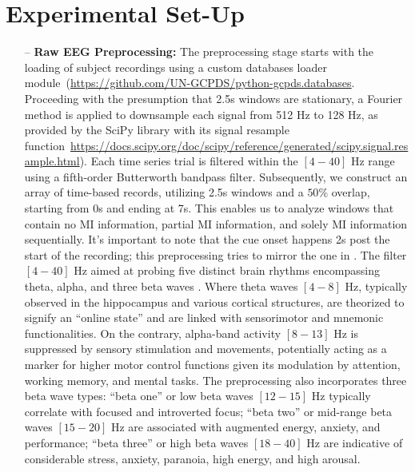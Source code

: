 \section{Experimental Set-Up}


\begin{itemize}

    \item[--] \textbf{Raw EEG Preprocessing:} The preprocessing stage starts with the loading of subject recordings using a custom databases loader module~(\url{https://github.com/UN-GCPDS/python-gcpds.databases}. Proceeding with the presumption that 2.5s windows are stationary, a Fourier method is applied to downsample each signal from 512 Hz to 128 Hz, as provided by the SciPy library with its signal resample function~\url{https://docs.scipy.org/doc/scipy/reference/generated/scipy.signal.resample.html}). Each time series trial is filtered within the $[4-40]$ Hz range using a fifth-order Butterworth bandpass filter. Subsequently, we construct an array of time-based records, utilizing 2.5s windows and a $50\%$ overlap, starting from 0s and ending at 7s. This enables us to analyze windows that contain no MI information, partial MI information, and solely MI information sequentially. It's important to note that the cue onset happens 2s post the start of the recording; this preprocessing tries to mirror the one in \cite{lawhern2018eegnet}. The filter $[4-40]$ Hz aimed at probing five distinct brain rhythms encompassing theta, alpha, and three beta waves \cite{ABHANG201651}. Where theta waves $[4-8]$ Hz, typically observed in the hippocampus and various cortical structures, are theorized to signify an ``online state'' and are linked with sensorimotor and mnemonic functionalities. On the contrary, alpha-band activity $[8-13]$ Hz is suppressed by sensory stimulation and movements, potentially acting as a marker for higher motor control functions given its modulation by attention, working memory, and mental tasks. The preprocessing also incorporates three beta wave types: ``beta one'' or low beta waves $[12-15]$ Hz typically correlate with focused and introverted focus; ``beta two'' or mid-range beta waves $[15-20]$ Hz are associated with augmented energy, anxiety, and performance; ``beta three'' or high beta waves $[18-40]$ Hz are indicative of considerable stress, anxiety, paranoia, high energy, and high arousal.


\end{itemize}
